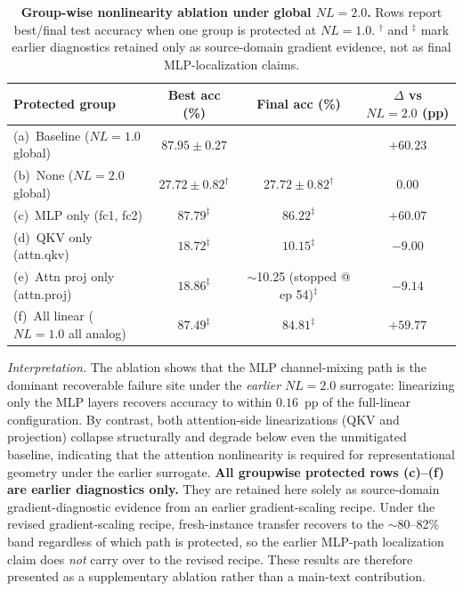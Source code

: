 \begin{table}[ht]
    \centering
    \caption{\textbf{Group-wise nonlinearity ablation under global $NL=2.0$.} Rows report best/final test accuracy when one group is protected at $NL=1.0$. $^\dagger$ and $^\ddagger$ mark earlier diagnostics retained only as source-domain gradient evidence, not as final MLP-localization claims.}
    \label{tab:supp-nl-ablation}
    \small
    \setlength{\tabcolsep}{5pt}
    \begin{tabular}{@{}lccc@{}}
        \toprule
        Protected group & Best acc (\%) & Final acc (\%) & $\Delta$ vs $NL=2.0$ (pp) \\
        \midrule
        (a)~Baseline ($NL=1.0$ global) & $87.95\pm0.27$ & \notrun{} & $+60.23$ \\
        (b)~None ($NL=2.0$ global) & $27.72\pm0.82^\dagger$ & $27.72\pm0.82^\dagger$ & $0.00$ \\
        (c)~MLP only (fc1, fc2) & $87.79^\ddagger$ & $86.22^\ddagger$ & $+60.07$ \\
        (d)~QKV only (attn.qkv) & $18.72^\ddagger$ & $10.15^\ddagger$ & $-9.00$ \\
        (e)~Attn proj only (attn.proj) & $18.86^\ddagger$ & $\sim$10.25 (stopped @ ep 54)$^\ddagger$ & $-9.14$ \\
        (f)~All linear ($NL=1.0$ all analog) & $87.49^\ddagger$ & $84.81^\ddagger$ & $+59.77$ \\
        \bottomrule
    \end{tabular}
\end{table}

\textit{Interpretation.} The ablation shows that the MLP channel-mixing path is the dominant recoverable failure site under the \emph{earlier} $NL=2.0$ surrogate: linearizing only the MLP layers recovers accuracy to within $0.16$~pp of the full-linear configuration. By contrast, both attention-side linearizations (QKV and projection) collapse structurally and degrade below even the unmitigated baseline, indicating that the attention nonlinearity is required for representational geometry under the earlier surrogate. \textbf{All groupwise protected rows (c)--(f) are earlier diagnostics only.} They are retained here solely as source-domain gradient-diagnostic evidence from an earlier gradient-scaling recipe. Under the revised gradient-scaling recipe, fresh-instance transfer recovers to the $\sim$80--82\% band regardless of which path is protected, so the earlier MLP-path localization claim does \emph{not} carry over to the revised recipe. These results are therefore presented as a supplementary ablation rather than a main-text contribution.

